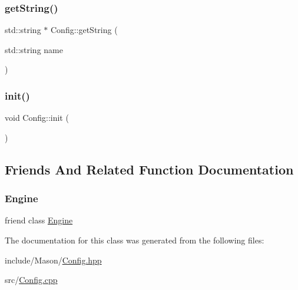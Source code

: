 \hypertarget{class_mason_1_1_config_abc367cc6194d049807fab3ff684996e3}{}\label{class_mason_1_1_config_abc367cc6194d049807fab3ff684996e3} 
\subsubsection{\texorpdfstring{get\+String()}{getString()}}
{\footnotesize\ttfamily std\+::string $\ast$ Config\+::get\+String (\begin{DoxyParamCaption}\item[{std\+::string}]{name }\end{DoxyParamCaption})\hspace{0.3cm}{\ttfamily [static]}}

\hypertarget{class_mason_1_1_config_a91bcb187ed95ec673137e413a4d77203}{}\label{class_mason_1_1_config_a91bcb187ed95ec673137e413a4d77203} 
\subsubsection{\texorpdfstring{init()}{init()}}
{\footnotesize\ttfamily void Config\+::init (\begin{DoxyParamCaption}{ }\end{DoxyParamCaption})\hspace{0.3cm}{\ttfamily [static]}}



\subsection{Friends And Related Function Documentation}
\hypertarget{class_mason_1_1_config_a3e1914489e4bed4f9f23cdeab34a43dc}{}\label{class_mason_1_1_config_a3e1914489e4bed4f9f23cdeab34a43dc} 
\subsubsection{\texorpdfstring{Engine}{Engine}}
{\footnotesize\ttfamily friend class \hyperlink{class_mason_1_1_engine}{Engine}\hspace{0.3cm}{\ttfamily [friend]}}



The documentation for this class was generated from the following files\+:\begin{DoxyCompactItemize}
\item 
include/\+Mason/\hyperlink{_config_8hpp}{Config.\+hpp}\item 
src/\hyperlink{_config_8cpp}{Config.\+cpp}\end{DoxyCompactItemize}
